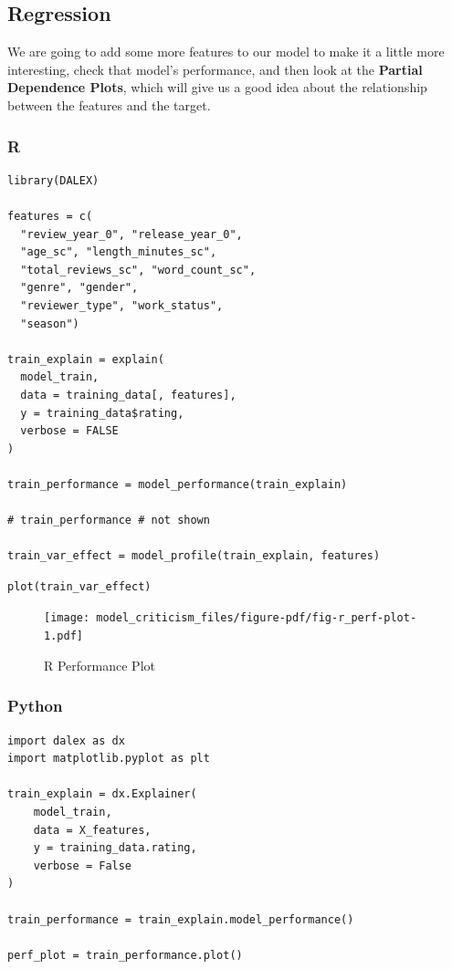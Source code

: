 \documentclass[
  letterpaper,
]{krantz}
\begin{document}
\subsection{Regression}\label{regression}

We are going to add some more features to our model to make it a little
more interesting, check that model's performance, and then look at the
\textbf{Partial Dependence Plots}, which will give us a good idea about
the relationship between the features and the target.

\subsubsection{R}

\begin{verbatim}
library(DALEX)

features = c(
  "review_year_0", "release_year_0",
  "age_sc", "length_minutes_sc", 
  "total_reviews_sc", "word_count_sc", 
  "genre", "gender", 
  "reviewer_type", "work_status", 
  "season")

train_explain = explain(
  model_train, 
  data = training_data[, features], 
  y = training_data$rating,
  verbose = FALSE
)

train_performance = model_performance(train_explain)

# train_performance # not shown

train_var_effect = model_profile(train_explain, features)
\end{verbatim}

\begin{verbatim}
plot(train_var_effect)
\end{verbatim}

\begin{figure}[H]

{\centering \texttt{[image: model\_criticism\_files/figure-pdf/fig-r\_perf-plot-1.pdf]}

}

\caption{\label{fig-r_perf-plot}R Performance Plot}

\end{figure}

\subsubsection{Python}

\begin{verbatim}
import dalex as dx
import matplotlib.pyplot as plt

train_explain = dx.Explainer(
    model_train, 
    data = X_features, 
    y = training_data.rating,
    verbose = False
)

train_performance = train_explain.model_performance()

perf_plot = train_performance.plot()
\end{verbatim}
\end{document}
